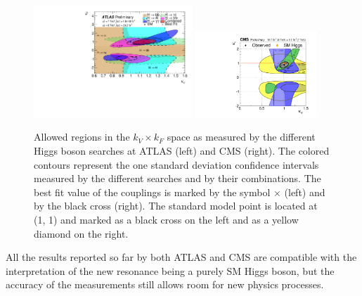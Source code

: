 \begin{figure}
        \centering
	\includegraphics[width=0.53\textwidth]{1_Introduction_Th_and_Exp/pics/fig_05b.pdf}
	\includegraphics[width=0.41\textwidth]{1_Introduction_Th_and_Exp/pics/cVcF_all_channels_2quadrant.pdf}
       \caption{Allowed regions in the $k_V \times k_F$ space as measured by the different Higgs boson searches at ATLAS (left) and CMS (right). The colored contours represent the one standard deviation confidence intervals measured by the different searches and by their combinations. The best fit value of the couplings is marked by the symbol $\times$ (left) and by the black cross (right). The standard model point is located at (1, 1) and marked as a black cross on the left and as a yellow diamond on the right. }
       \label{fig:kvf}
\end{figure}

All the results reported so far by both ATLAS and CMS are compatible with the interpretation of the new resonance being a purely SM Higgs boson, but the accuracy of the measurements still allows room for new physics processes.



